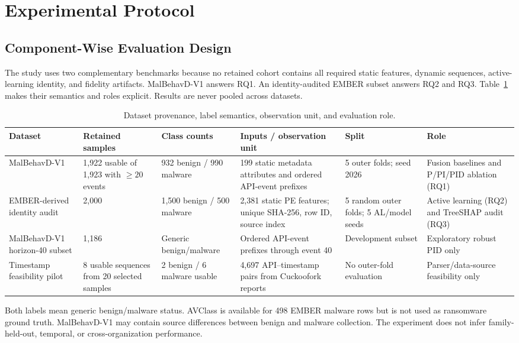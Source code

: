 \section{Experimental Protocol}
\label{sec:protocol}

\subsection{Component-Wise Evaluation Design}

The study uses two complementary benchmarks because no retained cohort contains
all required static features, dynamic sequences, active-learning identity, and
fidelity artifacts. MalBehavD-V1 answers RQ1. An identity-audited EMBER subset
answers RQ2 and RQ3. Table~\ref{tab:data} makes their semantics and roles
explicit. Results are never pooled across datasets.

\begin{table}[t]
\centering
\caption{Dataset provenance, label semantics, observation unit, and evaluation role.}
\label{tab:data}
\scriptsize
\setlength{\tabcolsep}{3pt}
\begin{tabular}{p{2.5cm}p{2.2cm}p{2.2cm}p{3.2cm}p{2.2cm}p{2.9cm}}
\toprule
Dataset & Retained samples & Class counts & Inputs / observation unit & Split & Role \\
\midrule
MalBehavD-V1 & 1,922 usable of 1,923 with $\geq20$ events & 932 benign / 990 malware & 199 static metadata attributes and ordered API-event prefixes & 5 outer folds; seed 2026 & Fusion baselines and P/PI/PID ablation (RQ1) \\
EMBER-derived identity audit & 2,000 & 1,500 benign / 500 malware & 2,381 static PE features; unique SHA-256, row ID, source index & 5 random outer folds; 5 AL/model seeds & Active learning (RQ2) and TreeSHAP audit (RQ3) \\
MalBehavD-V1 horizon-40 subset & 1,186 & Generic benign/malware & Ordered API-event prefixes through event 40 & Development subset & Exploratory robust PID only \\
Timestamp feasibility pilot & 8 usable sequences from 20 selected samples & 2 benign / 6 malware usable & 4,697 API--timestamp pairs from Cuckoofork reports & No outer-fold evaluation & Parser/data-source feasibility only \\
\bottomrule
\end{tabular}
\end{table}

Both labels mean generic benign/malware status. AVClass is available for 498
EMBER malware rows but is not used as ransomware ground truth. MalBehavD-V1 may
contain source differences between benign and malware collection. The experiment
does not infer family-held-out, temporal, or cross-organization performance.


